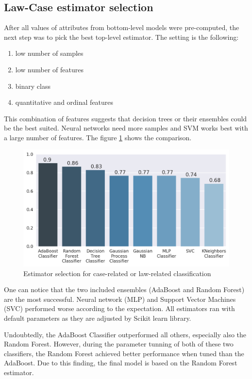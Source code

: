 \documentclass[
  digital, %
  notable,   %
  nolof,     %
  nolot,     %
]{fithesis3}
\begin{document}
\subsection{Law-Case estimator selection}
\label{eval:law-case-model-selection}
After all values of attributes from bottom-level models were pre-computed, the next step was to pick the best top-level estimator.
The setting is the following:
\begin{enumerate}
\item low number of samples
\item low number of features
\item binary class
\item quantitative and ordinal features
\end{enumerate}
This combination of features suggests that decision trees or their ensembles could be the best suited.
Neural networks need more samples and SVM works best with a large number of features.
The figure \ref{fig:eval_law-case-model-selection} shows the comparison.

\begin{figure}[h]
\caption{Estimator selection for case-related or law-related classification}
\label{fig:eval_law-case-model-selection}
\includegraphics[width=\textwidth]{img/eval_law-case-model-selection}
\end{figure}

One can notice that the two included ensembles (AdaBoost and Random Forest) are the most successful.
Neural network (MLP) and Support Vector Machines (SVC) performed worse according to the expectation.
All estimators ran with default parameters as they are adjusted by Scikit learn library.

Undoubtedly, the AdaBoost Classifier outperformed all others, especially also the Random Forest.
However, during the parameter tunning of both of these two classifiers, the Random Forest achieved better performance when tuned than the AdaBoost.
Due to this finding, the final model is based on the Random Forest estimator.
\end{document}

